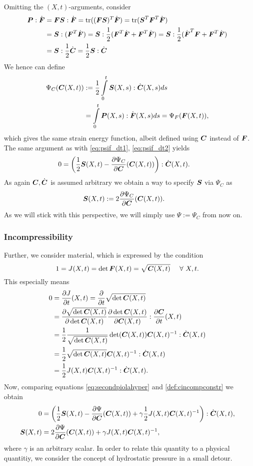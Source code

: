 Omitting the $(X,t)$-arguments, consider
\begin{align}
	\boldsymbol{P}:\dot{\boldsymbol{F}} &= \boldsymbol{F}\boldsymbol{S} : \dot{\boldsymbol{F}} = \operatorname{tr}((\boldsymbol{F}\boldsymbol{S})^T\dot{\boldsymbol{F}}) = \operatorname{tr}(\boldsymbol{S}^T\boldsymbol{F}^T\dot{\boldsymbol{F}})\\
	&= \boldsymbol{S} : (\boldsymbol{F}^T\dot{\boldsymbol{F}}) = \boldsymbol{S} : \frac{1}{2}(\boldsymbol{F}^T\dot{\boldsymbol{F}} + \boldsymbol{F}^T\dot{\boldsymbol{F}})  = \boldsymbol{S} : \frac{1}{2}(\dot{\boldsymbol{F}}^T\boldsymbol{F} + \boldsymbol{F}^T\dot{\boldsymbol{F}})\\
	&= \boldsymbol{S} : \frac{1}{2}\dot{\boldsymbol{C}} = \frac{1}{2}\boldsymbol{S} : \dot{\boldsymbol{C}}
\end{align}
We hence can define
\begin{align}
	\Psi_C(\boldsymbol{C}(X,t)) &:= \frac{1}{2}\int\limits_{0}^{t}\boldsymbol{S}(X,s):\dot{\boldsymbol{C}}(X,s)ds\\
		& = \int\limits_{0}^{t}\boldsymbol{P}(X,s):\dot{\boldsymbol{F}}(X,s)ds = \Psi_F(\boldsymbol{F}(X,t)),
\end{align}
which gives the same strain energy function, albeit defined using $\boldsymbol{C}$ instead of $\boldsymbol{F}$.
The same argument as with \eqref{eq:psif_dt1}, \eqref{eq:psif_dt2} yields
\begin{align}
	0 &= \left(\frac{1}{2}\boldsymbol{S}(X,t) - \frac{\partial \Psi_C}{\partial \boldsymbol{C}}(\boldsymbol{C}(X,t))\right):\dot{\boldsymbol{C}}(X,t).\label{eq:secondpiolahyper}
\end{align}
As again $\boldsymbol{C},\dot{\boldsymbol{C}}$ is assumed arbitrary we obtain a way to specify $\boldsymbol{S}$ via $\Psi_C$ as
\begin{align}
	\boldsymbol{S}(X,t) & := 2\frac{\partial \Psi_C}{\partial \boldsymbol{C}}(\boldsymbol{C}(X,t)).
\end{align}
As we will stick with this perspective, we will simply use $\Psi := \Psi_C$ from now on.

\subsubsection{Incompressibility}
Further, we consider  material, which is expressed by the condition 
\[
	1 = J(X,t) = \det\boldsymbol{F}(X,t) = \sqrt{\boldsymbol{C}(X,t)}\quad~\forall~ X,t.
\]
This especially means
\begin{align}
	0 &= \frac{\partial J}{\partial t}(X,t) = \frac{\partial }{\partial t}\sqrt{\det\boldsymbol{C}(X,t)}\nonumber\\
	&= \frac{\partial \sqrt{\det\boldsymbol{C}(X,t)}}{\partial \det\boldsymbol{C}(X,t)}\frac{\partial \det\boldsymbol{C}(X,t)}{\partial \boldsymbol{C}(X,t)}:\frac{\partial \boldsymbol{C}}{\partial t}(X,t)\nonumber\\
	&=\frac{1}{2}\frac{1}{\sqrt{\det\boldsymbol{C}(X,t)}} \det(\boldsymbol{C}(X,t))\boldsymbol{C}(X,t)^{-1}:\dot{\boldsymbol{C}}(X,t)\nonumber\\
	&=\frac{1}{2}\sqrt{\det\boldsymbol{C}(X,t)}\boldsymbol{C}(X,t)^{-1}:\dot{\boldsymbol{C}}(X,t)\nonumber\\
	&=\frac{1}{2}J(X,t)\boldsymbol{C}(X,t)^{-1}:\dot{\boldsymbol{C}}(X,t).\label{def:cincompconstr}
\end{align}
Now, comparing equations \eqref{eq:secondpiolahyper} and \eqref{def:cincompconstr} we obtain
\begin{align}
	0 &= \left(\frac{1}{2}\boldsymbol{S}(X,t) - \frac{\partial \Psi}{\partial \boldsymbol{C}}(\boldsymbol{C}(X,t)) + \gamma\frac{1}{2}J(X,t)\boldsymbol{C}(X,t)^{-1}\right):\dot{\boldsymbol{C}}(X,t),\\
	\boldsymbol{S}(X,t) &= 2\frac{\partial \Psi}{\partial \boldsymbol{C}}(\boldsymbol{C}(X,t)) + \gamma J(X,t)\boldsymbol{C}(X,t)^{-1},\label{def:incompressible_secondpiola}
\end{align}
where $\gamma$ is an arbitrary scalar.
In order to relate this quantity to a physical quantitiy, we consider the concept of hydrostatic pressure in a small detour.

